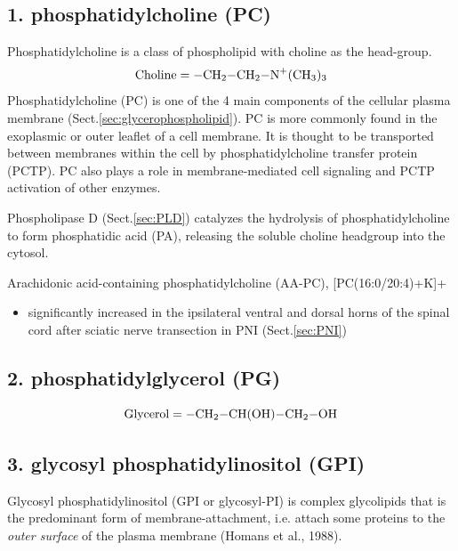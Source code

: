   
\subsection{1. phosphatidylcholine (PC)}
\label{sec:phosphatidylcholine}

Phosphatidylcholine is a class of phospholipid with choline as the head-group.
\begin{equation}
\text{Choline} = \ce{-CH2-CH2-N^+(CH3)_3}
\end{equation}
Phosphatidylcholine (PC) is one of the 4 main components of the cellular plasma
membrane (Sect.\ref{sec:glycerophospholipid}).
PC is more commonly found in the exoplasmic or outer leaflet of a cell membrane.
It is thought to be transported between membranes within the cell by
phosphatidylcholine transfer protein (PCTP). PC also plays a
role in membrane-mediated cell signaling and PCTP activation of other enzymes.
 
Phospholipase D (Sect.\ref{sec:PLD}) catalyzes the hydrolysis of
phosphatidylcholine to form phosphatidic acid (PA), releasing the soluble
choline headgroup into the cytosol.

Arachidonic acid-containing phosphatidylcholine (AA-PC), [PC(16:0/20:4)+K]+
\begin{itemize}
  \item  significantly increased in the ipsilateral ventral and dorsal horns of
  the spinal cord after sciatic nerve transection in PNI (Sect.\ref{sec:PNI})
\end{itemize}

\subsection{2. phosphatidylglycerol (PG)}
\label{sec:phosphatidylglycerol}

\begin{equation}
\text{Glycerol} = \ce{-CH2-CH(OH)-CH2-OH}
\end{equation}

\subsection{3. glycosyl phosphatidylinositol (GPI)}
\label{sec:GPI}
\label{sec:glycosyl-phosphatidylinositol}

Glycosyl phosphatidylinositol (GPI or glycosyl-PI) is complex glycolipids that
is the predominant form of membrane-attachment, i.e. attach some proteins to the
{\it outer surface} of the plasma membrane (Homans et al., 1988).


